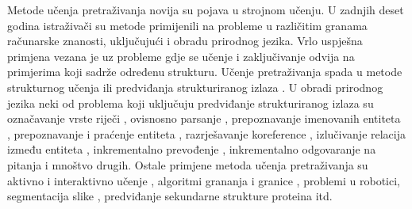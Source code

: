Metode učenja pretraživanja  novija su
pojava u strojnom učenju. U zadnjih deset godina istraživači su metode
primijenili na probleme u različitim granama računarske znanosti, uključujući i
obradu prirodnog jezika. Vrlo uspješna primjena vezana je uz probleme gdje se
učenje i zaključivanje odvija na primjerima koji sadrže određenu strukturu.
Učenje pretraživanja spada u metode strukturnog učenja  ili predviđanja strukturiranog izlaza . U obradi prirodnog jezika neki od problema koji uključuju
predviđanje strukturiranog izlaza su označavanje vrste riječi
, ovisnosno parsanje ,
prepoznavanje imenovanih entiteta , prepoznavanje
i praćenje entiteta , razrješavanje
koreference , izlučivanje relacija između entiteta
, inkrementalno prevođenje , inkrementalno odgovaranje na pitanja  i mnoštvo drugih. Ostale primjene metoda učenja pretraživanja su
aktivno i interaktivno učenje , algoritmi
grananja i granice , problemi u robotici, segmentacija
slike , predviđanje sekundarne strukture proteina
 itd.


